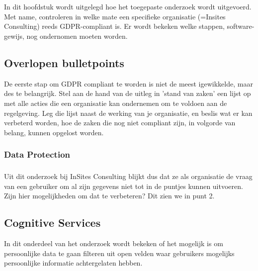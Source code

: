 
\chapter{}
\label{ch:methodologie}

In dit hoofdstuk wordt uitgelegd hoe het toegepaste onderzoek wordt uitgevoerd. Met name, controleren in welke mate een specifieke organisatie (=Insites Consulting) reeds GDPR-compliant is. Er wordt bekeken welke stappen, software-gewijs, nog ondernomen moeten worden. 



\section{Overlopen bulletpoints}
De eerste stap om GDPR compliant te worden is niet de meest igewikkelde, maar des te belangrijk. Stel aan de hand van de uitleg in 'stand van zaken' een lijst op met alle acties die een organisatie kan ondernemen om te voldoen aan de regelgeving. Leg die lijst naast de werking van je organisatie, en beslis wat er kan verbeterd worden, hoe de zaken die nog niet compliant zijn, in volgorde van belang, kunnen opgelost worden.  

\subsection{Data Protection}


\subsection{}
Uit dit onderzoek bij InSites Consulting blijkt dus dat ze als organisatie de vraag van een gebruiker om al zijn gegevens niet tot in de puntjes kunnen uitvoeren. Zijn hier mogelijkheden om dat te verbeteren? Dit zien we in punt 2. 

\section{Cognitive Services}
In dit onderdeel van het onderzoek wordt bekeken of het mogelijk is om persoonlijke data te gaan filteren uit open velden waar gebruikers mogelijks persoonlijke informatie achtergelaten hebben. 

